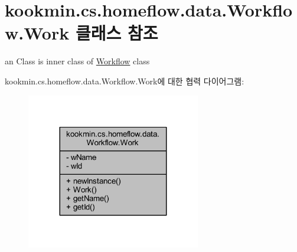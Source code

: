\hypertarget{classkookmin_1_1cs_1_1homeflow_1_1data_1_1_workflow_1_1_work}{}\section{kookmin.\+cs.\+homeflow.\+data.\+Workflow.\+Work 클래스 참조}
\label{classkookmin_1_1cs_1_1homeflow_1_1data_1_1_workflow_1_1_work}


an Class is inner class of \hyperlink{classkookmin_1_1cs_1_1homeflow_1_1data_1_1_workflow}{Workflow} class  




kookmin.\+cs.\+homeflow.\+data.\+Workflow.\+Work에 대한 협력 다이어그램\+:
\nopagebreak
\begin{figure}[H]
\begin{center}
\leavevmode
\includegraphics[width=215pt]{classkookmin_1_1cs_1_1homeflow_1_1data_1_1_workflow_1_1_work__coll__graph}
\end{center}
\end{figure}
